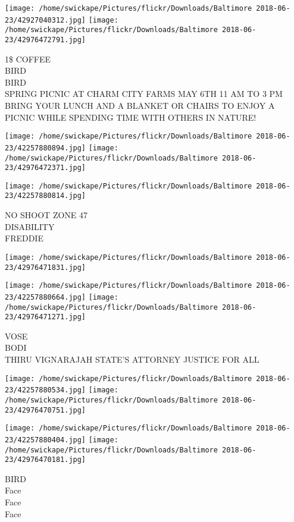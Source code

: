 \documentclass[10pt,letterpaper]{article}
\begin{document}
\texttt{[image: /home/swickape/Pictures/flickr/Downloads/Baltimore 2018-06-23/42927040312.jpg]}
\texttt{[image: /home/swickape/Pictures/flickr/Downloads/Baltimore 2018-06-23/42976472791.jpg]}

1\$ COFFEE\\
BIRD\\
BIRD\\
SPRING PICNIC AT CHARM CITY FARMS MAY 6TH 11 AM TO 3 PM BRING YOUR LUNCH AND A BLANKET OR CHAIRS TO ENJOY A PICNIC WHILE SPENDING TIME WITH OTHERS IN NATURE!\\
\pagebreak

\texttt{[image: /home/swickape/Pictures/flickr/Downloads/Baltimore 2018-06-23/42257880894.jpg]}
\texttt{[image: /home/swickape/Pictures/flickr/Downloads/Baltimore 2018-06-23/42976472371.jpg]}

\texttt{[image: /home/swickape/Pictures/flickr/Downloads/Baltimore 2018-06-23/42257880814.jpg]}

NO SHOOT ZONE 47\\
DISABILITY\\
FREDDIE\\
\pagebreak

\texttt{[image: /home/swickape/Pictures/flickr/Downloads/Baltimore 2018-06-23/42976471831.jpg]}

\vspace{0.25in}
\texttt{[image: /home/swickape/Pictures/flickr/Downloads/Baltimore 2018-06-23/42257880664.jpg]}
\texttt{[image: /home/swickape/Pictures/flickr/Downloads/Baltimore 2018-06-23/42976471271.jpg]}

VOSE\\
BODI\\
THIRU VIGNARAJAH STATE'S ATTORNEY JUSTICE FOR ALL\\
\pagebreak

\texttt{[image: /home/swickape/Pictures/flickr/Downloads/Baltimore 2018-06-23/42257880534.jpg]}
\texttt{[image: /home/swickape/Pictures/flickr/Downloads/Baltimore 2018-06-23/42976470751.jpg]}

\texttt{[image: /home/swickape/Pictures/flickr/Downloads/Baltimore 2018-06-23/42257880404.jpg]}
\texttt{[image: /home/swickape/Pictures/flickr/Downloads/Baltimore 2018-06-23/42976470181.jpg]}

BIRD\\
Face\\
Face\\
Face\\
\pagebreak
\end{document}
